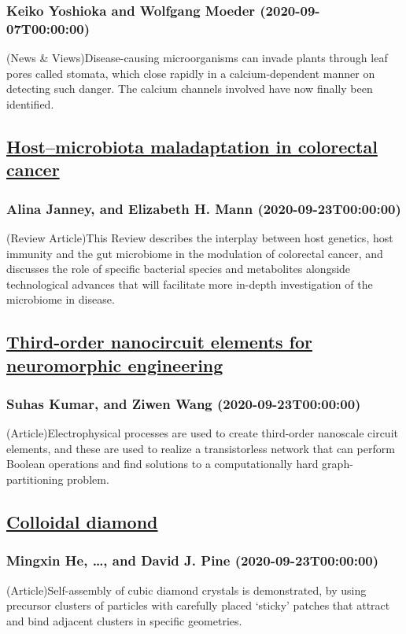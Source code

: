 \subsubsection*{Keiko Yoshioka and Wolfgang Moeder (2020-09-07T00:00:00)}
(News \& Views)Disease-causing microorganisms can invade plants through leaf pores called stomata, which close rapidly in a calcium-dependent manner on detecting such danger. The calcium channels involved have now finally been identified.
\subsection*{\href{https://www.nature.com/articles/s41586-020-2729-3}{Host–microbiota maladaptation in colorectal cancer}}
\subsubsection*{Alina Janney, and Elizabeth H. Mann (2020-09-23T00:00:00)}
(Review Article)This Review describes the interplay between host genetics, host immunity and the gut microbiome in the modulation of colorectal cancer, and discusses the role of specific bacterial species and metabolites alongside technological advances that will facilitate more in-depth investigation of the microbiome in disease.
\subsection*{\href{https://www.nature.com/articles/s41586-020-2735-5}{Third-order nanocircuit elements for neuromorphic engineering}}
\subsubsection*{Suhas Kumar, and Ziwen Wang (2020-09-23T00:00:00)}
(Article)Electrophysical processes are used to create third-order nanoscale circuit elements, and these are used to realize a transistorless network that can perform Boolean operations and find solutions to a computationally hard graph-partitioning problem.
\subsection*{\href{https://www.nature.com/articles/s41586-020-2718-6}{Colloidal diamond}}
\subsubsection*{Mingxin He, \dots, and David J. Pine (2020-09-23T00:00:00)}
(Article)Self-assembly of cubic diamond crystals is demonstrated, by using precursor clusters of particles with carefully placed ‘sticky’ patches that attract and bind adjacent clusters in specific geometries.
